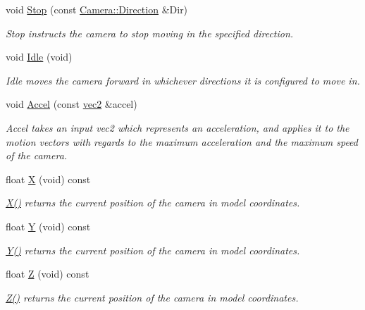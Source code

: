\begin{DoxyCompactItemize}
void \hyperlink{class_camera_adf064f765f610684e0675bd67de013fd}{Stop} (const \hyperlink{class_camera_a80cb65605322d27ad3b6d973484509ec}{Camera\-::\-Direction} \&Dir)
\begin{DoxyCompactList}\small\item\em Stop instructs the camera to stop moving in the specified direction. \end{DoxyCompactList}\item 
void \hyperlink{class_camera_aec3559fe43597656629fdb00157d3c73}{Idle} (void)
\begin{DoxyCompactList}\small\item\em Idle moves the camera forward in whichever directions it is configured to move in. \end{DoxyCompactList}\item 
void \hyperlink{class_camera_ad666b5d70a00a0116100bce3d01471bf}{Accel} (const \hyperlink{struct_angel_1_1vec2}{vec2} \&accel)
\begin{DoxyCompactList}\small\item\em Accel takes an input vec2 which represents an acceleration, and applies it to the motion vectors with regards to the maximum acceleration and the maximum speed of the camera. \end{DoxyCompactList}\item 
float \hyperlink{class_camera_a2f7fd64d5d6e0dfb5edcca53c7d15994}{X} (void) const 
\begin{DoxyCompactList}\small\item\em \hyperlink{class_camera_a2f7fd64d5d6e0dfb5edcca53c7d15994}{X()} returns the current position of the camera in model coordinates. \end{DoxyCompactList}\item 
float \hyperlink{class_camera_a37529ef93871f547ebfd5862bc6cce62}{Y} (void) const 
\begin{DoxyCompactList}\small\item\em \hyperlink{class_camera_a37529ef93871f547ebfd5862bc6cce62}{Y()} returns the current position of the camera in model coordinates. \end{DoxyCompactList}\item 
float \hyperlink{class_camera_abf1730e47e8e51c76acbddcaa85e2475}{Z} (void) const 
\begin{DoxyCompactList}\small\item\em \hyperlink{class_camera_abf1730e47e8e51c76acbddcaa85e2475}{Z()} returns the current position of the camera in model coordinates. \end{DoxyCompactList}\item 

\end{DoxyCompactItemize}
